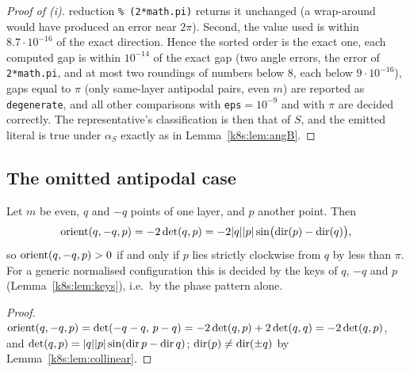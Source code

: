 \begin{proof}[Proof of (i)]
reduction \texttt{\%~(2*math.pi)} returns it unchanged (a wrap-around would have produced an error near $2\pi$).
Second, the value used is within $8.7\cdot10^{-16}$ of the exact direction. Hence the sorted order is
the exact one, each computed gap is within $10^{-14}$ of the exact gap (two angle errors, the error of
\texttt{2*math.pi}, and at most two roundings of numbers below $8$, each below $9\cdot10^{-16}$), gaps equal to $\pi$ (only same-layer antipodal
pairs, even $m$) are reported as \texttt{degenerate}, and all other comparisons with \texttt{eps}$=10^{-9}$ and with $\pi$
are decided correctly. The representative's classification is then that of $S$, and the emitted literal is true under
$\alpha_S$ exactly as in Lemma~\ref{k8s:lem:angB}.
\end{proof}

\subsection{The omitted antipodal case}\label{k8s:sec:antipodal}

\begin{lemma}\label{k8s:lem:diam}
Let $m$ be even, $q$ and $-q$ points of one layer, and $p$ another point. Then
\[
\operatorname{orient}(q,-q,p)=-2\det(q,p)=-2|q||p|\sin\bigl(\operatorname{dir}(p)-\operatorname{dir}(q)\bigr),
\]
so $\operatorname{orient}(q,-q,p)>0$ if and only if $p$ lies strictly clockwise from $q$ by less than $\pi$. For a generic normalised
configuration this is decided by the keys of $q$, $-q$ and $p$ (Lemma~\ref{k8s:lem:keys}), i.e.\ by the phase pattern
alone.
\end{lemma}

\begin{proof}
$\operatorname{orient}(q,-q,p)=\det(-q-q,\,p-q)=-2\det(q,p)+2\det(q,q)=-2\det(q,p)$, and $\det(q,p)=|q||p|\sin(\operatorname{dir} p-\operatorname{dir} q)$;
$\operatorname{dir}(p)\ne\operatorname{dir}(\pm q)$ by Lemma~\ref{k8s:lem:collinear}.
\end{proof}

